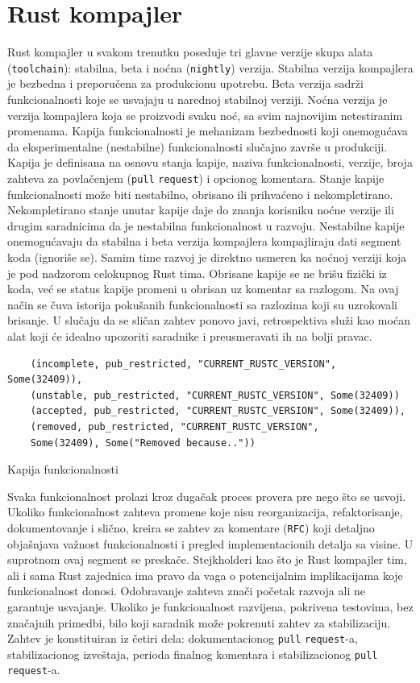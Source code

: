 \documentclass[11pt]{article}
\begin{document}
\section{Rust kompajler}

Rust kompajler u svakom trenutku poseduje tri glavne verzije skupa alata (\verb|toolchain|): stabilna, beta i noćna (\verb|nightly|) verzija.
Stabilna verzija kompajlera je bezbedna i preporučena za produkcionu upotrebu. Beta verzija sadrži funkcionalnosti
koje se usvajaju u narednoj stabilnoj verziji. Noćna verzija je verzija kompajlera koja se 
proizvodi svaku noć, sa svim najnovijim netestiranim promenama. Kapija funkcionalnosti je mehanizam bezbednosti
koji onemogućava da eksperimentalne (nestabilne) funkcionalnosti slučajno završe u produkciji. 
Kapija je definisana na osnovu stanja kapije, naziva funkcionalnosti, verzije, broja zahteva za povlačenjem
(\verb|pull| \verb|request|) i opcionog komentara.
Stanje kapije funkcionalnosti može biti nestabilno, obrisano ili prihvaćeno i nekompletirano. Nekompletirano 
stanje unutar kapije daje do znanja korisniku noćne verzije ili drugim saradnicima da je nestabilna funkcionalnost 
u razvoju.  Nestabilne kapije onemogućavaju da stabilna i beta verzija kompajlera kompajliraju 
dati segment koda (ignoriše se).  Samim time razvoj je direktno 
usmeren ka noćnoj verziji koja je pod nadzorom celokupnog Rust tima. Obrisane kapije se ne brišu fizički iz koda,
već se status kapije promeni u obrisan uz komentar sa razlogom. Na ovaj način se čuva istorija pokušanih 
funkcionalnosti sa razlozima koji su uzrokovali brisanje. U slučaju da se sličan zahtev ponovo javi, retrospektiva
služi kao moćan alat koji će idealno upozoriti saradnike i preusmeravati ih na bolji pravac.

\begin{listing}[H]
\begin{verbatim}
    (incomplete, pub_restricted, "CURRENT_RUSTC_VERSION", Some(32409)),
    (unstable, pub_restricted, "CURRENT_RUSTC_VERSION", Some(32409))
    (accepted, pub_restricted, "CURRENT_RUSTC_VERSION", Some(32409)),
    (removed, pub_restricted, "CURRENT_RUSTC_VERSION", 
    Some(32409), Some("Removed because.."))
\end{verbatim}
\caption{Kapija funkcionalnosti}
\label{lst:rustup_set}
\end{listing}

Svaka funkcionalnost prolazi kroz dugačak proces provera pre nego 
što se usvoji. Ukoliko funkcionalnost zahteva promene koje nisu reorganizacija, refaktorisanje, dokumentovanje
i slično, kreira se zahtev za komentare (\verb|RFC|) koji detaljno objašnjava važnost funkcionalnosti i 
pregled implementacionih detalja sa visine. U suprotnom ovaj segment se preskače. Stejkholderi kao što je Rust kompajler tim, ali i sama Rust zajednica 
ima pravo da vaga o potencijalnim implikacijama koje funkcionalnost donosi. Odobravanje zahteva znači početak 
razvoja ali ne garantuje usvajanje. Ukoliko je funkcionalnost razvijena, pokrivena testovima, 
bez značajnih primedbi, bilo koji saradnik može pokrenuti zahtev za stabilizaciju. Zahtev je konstituiran iz 
četiri dela: dokumentacionog \verb|pull| \verb|request|-a, stabilizacionog izveštaja, 
perioda finalnog komentara i stabilizacionog \verb|pull| \verb|request|-a.
\end{document}
